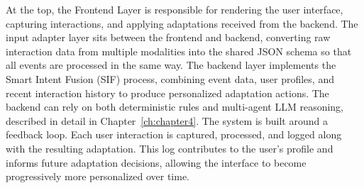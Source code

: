At the top, the Frontend Layer is responsible for rendering the user interface, capturing interactions, and applying adaptations received from the backend. The input adapter layer sits between the frontend and backend, converting raw interaction data from multiple modalities into the shared JSON schema so that all events are processed in the same way. The backend layer implements the Smart Intent Fusion (SIF) process, combining event data, user profiles, and recent interaction history to produce personalized adaptation actions. The backend can rely on both deterministic rules and multi-agent LLM reasoning, described in detail in Chapter~\ref{ch:chapter4}. 
The system is built around a feedback loop. Each user interaction is captured, processed, and logged along with the resulting adaptation. This log contributes to the user’s profile and informs future adaptation decisions, allowing the interface to become progressively more personalized over time.

